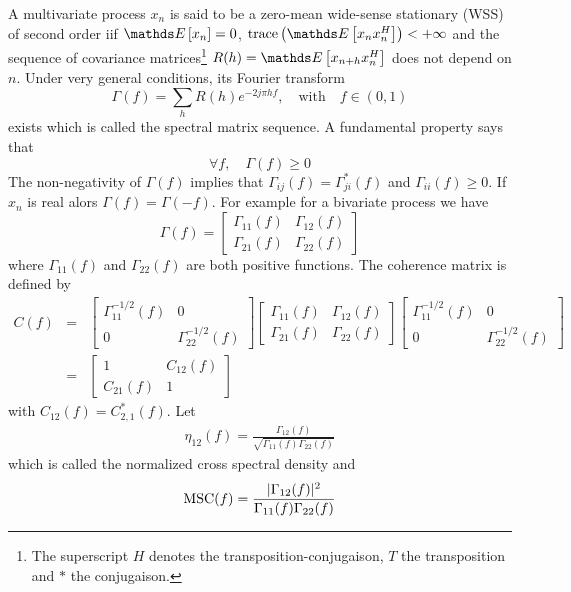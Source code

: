 A multivariate process $x_{n}$ is said to be a zero-mean wide-sense stationary (WSS) of second order iif $\esp{x_{n}}=0$, $\trace{\esp{x_{n}x_{n}^{H}}}<+\infty$ and the sequence of covariance matrices\footnote{The superscript $H$ denotes the transposition-conjugaison, $T$ the transposition and $*$ the conjugaison.} $R(h)=\esp{x_{n+h}x_{n}^{H}}$ does not depend on $n$. Under very general conditions, its Fourier transform
$$
 \Gamma(f)=\sum_{h} R(h)e^{-2j\pi hf},\quad\text{with}\quad 
 f\in(0,1)
$$
exists which is called the spectral matrix sequence. A fundamental property says that 
$$
 \forall f, \quad \Gamma(f)\geq 0
$$
The non-negativity of $\Gamma(f)$ implies that $\Gamma_{ij}(f)=\Gamma_{ji}^{*}(f)$ and $\Gamma_{ii}(f)\geq 0$. If $x_{n}$ is real alors $\Gamma(f)=\Gamma(-f)$. For example for a bivariate process we have
$$
 \Gamma(f)=
 \begin{bmatrix}
 \Gamma_{11}(f)&\Gamma_{12}(f)\\
 \Gamma_{21}(f)&\Gamma_{22}(f)
 \end{bmatrix}
$$
where $ \Gamma_{11}(f)$ and $ \Gamma_{22}(f)$ are both positive functions. The coherence matrix is defined by
\begin{eqnarray*}
 C(f) 
 &=&
 \begin{bmatrix}
 \Gamma_{11}^{-1/2}(f)&0
 \\
 0& \Gamma_{22}^{-1/2}(f)
 \end{bmatrix}
  \begin{bmatrix}
 \Gamma_{11}(f)&\Gamma_{12}(f)\\ \Gamma_{21}(f)&\Gamma_{22}(f)
 \end{bmatrix}
 \begin{bmatrix}
 \Gamma_{11}^{-1/2}(f)&0
 \\
 0& \Gamma_{22}^{-1/2}(f)
 \end{bmatrix}
 \\
 &=&
   \begin{bmatrix}
 1&C_{12}(f)\\ C_{21}(f)&1
 \end{bmatrix}
\end{eqnarray*}
with $C_{12}(f)=C_{2,1}^{*}(f)$. Let
\begin{eqnarray}
\label{eq:defCSD}
 \eta_{12}(f)= \frac{\Gamma_{12}(f)}{\sqrt{\Gamma_{11}(f)\Gamma_{22}(f)}}
\end{eqnarray}
which is called the  normalized cross spectral density and
\begin{eqnarray}
\label{eq:defMSC}
 \mathrm{MSC}(f)= \frac{|\Gamma_{12}(f)|^{2}}{\Gamma_{11}(f)\Gamma_{22}(f)}
\end{eqnarray}
